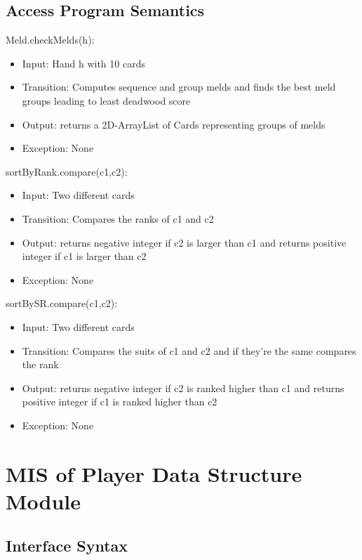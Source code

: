 \documentclass[12pt, titlepage]{article}
\begin{document}
\subsection{Access Program Semantics}
\noindent Meld.checkMelds(h):
\begin{itemize}
    \item Input: Hand h with 10 cards
    \item Transition: Computes sequence and group melds and finds the best meld groups leading to least deadwood score
    \item Output: returns a 2D-ArrayList of Cards representing groups of melds
    \item Exception: None
\end{itemize}

\noindent sortByRank.compare(c1,c2):
\begin{itemize}
    \item Input: Two different cards
    \item Transition: Compares the ranks of c1 and c2
    \item Output: returns negative integer if c2 is larger than c1 and returns positive integer if c1 is larger than c2
    \item Exception: None
\end{itemize}

\noindent sortBySR.compare(c1,c2):
\begin{itemize}
    \item Input: Two different cards
    \item Transition: Compares the suits of c1 and c2 and if they're the same compares the rank
    \item Output: returns negative integer if c2 is ranked higher than c1 and returns positive integer if c1 is ranked higher than c2
    \item Exception: None
\end{itemize}

\section{MIS of Player Data Structure Module}

\subsection{Interface Syntax}
\end{document}
